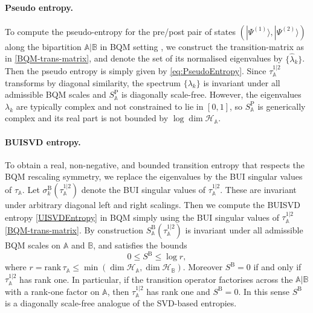 \documentclass[11pt,a4paper]{article}
\begin{document}
\paragraph{Pseudo entropy.}
To compute the pseudo-entropy \cite{Nakata:2020luh} for the pre/post pair of states $(|\Psi^{(1)}\rangle,|\Psi^{(2)}\rangle)$ along the bipartition $\mathbb A|\mathbb B$ in BQM setting \cite{Chen:2025ibe}, we construct the transition-matrix as in \cref{BQM-trans-matrix}, and denote the set of its normalised eigenvalues by $\{\hat{\lambda}_k\}$. Then the pseudo entropy is simply given by \cref{eq:PseudoEntropy}. Since $\tau^{1|2}_\mathbb{A}$ transforms by diagonal similarity, the spectrum $\{\lambda_k\}$ is invariant under all admissible BQM scales and $S^{\mathrm P}_\mathbb{A}$ is diagonally scale-free. However, the eigenvalues $\lambda_k$ are typically complex and not constrained to lie in $[0,1]$, so $S^{\mathrm P}_\mathbb{A}$ is generically complex and its real part is not bounded by $\log\dim\mathcal H_\mathbb{A}$. 
\paragraph{BUISVD entropy.} To obtain a real, non-negative, and bounded transition entropy that respects the BQM rescaling symmetry, we replace the eigenvalues by the BUI singular values of $\tau_\mathbb{A}$. Let $\sigma^{\mathrm B}_k(\tau^{1|2}_\mathbb{A})$ denote the BUI singular values of $\tau^{1|2}_\mathbb{A}$. These are invariant under arbitrary diagonal left and right scalings. Then we compute the BUISVD entropy \cref{UISVDEntropy} in BQM simply using the BUI singular values of $\tau^{1|2}_\mathbb{A}$ \cref{BQM-trans-matrix}. By construction $S^{\mathrm B}_\mathbb A(\tau^{1|2}_\mathbb{A})$ is invariant under all admissible BQM scales on $\mathbb A$ and $\mathbb B$, and satisfies the bounds
\begin{equation}
0\le S^{\mathrm B}
\le\log r,
\end{equation}
where $r=\mathrm{rank}\,\tau_\mathbb{A} \le\min(\dim\mathcal H_\mathbb{A},\dim\mathcal H_\mathbb{B})$. Moreover $ S^{\mathrm B}=0$ if and only if $\tau^{1|2}_\mathbb{A}$ has rank one. In particular, if the transition operator factorises across the $\mathbb A|\mathbb B$ with a rank-one factor on $\mathbb A$, then $\tau^{1|2}_\mathbb{A}$ has rank one and $ S^{\mathrm B}=0$. In this sense $S^{\mathrm B}$ is a diagonally scale-free analogue of the SVD-based entropies.
\end{document}
